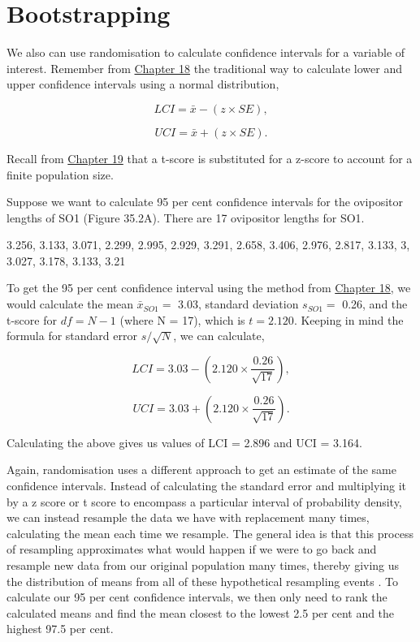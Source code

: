 \documentclass[
]{scrbook}
\begin{document}
\hypertarget{bootstrapping}{%
\section{Bootstrapping}\label{bootstrapping}}

We also can use randomisation to calculate confidence intervals for a variable of interest. Remember from \protect\hyperlink{Chapter_18}{Chapter 18} the traditional way to calculate lower and upper confidence intervals using a normal distribution,

\[LCI = \bar{x} - (z \times SE),\]

\[UCI = \bar{x} + (z \times SE).\]

Recall from \protect\hyperlink{Chapter_19}{Chapter 19} that a t-score is substituted for a z-score to account for a finite population size.

Suppose we want to calculate 95 per cent confidence intervals for the ovipositor lengths of SO1 (Figure 35.2A).
There are 17 ovipositor lengths for SO1.

3.256, 3.133, 3.071, 2.299, 2.995, 2.929, 3.291, 2.658, 3.406, 2.976, 2.817, 3.133, 3, 3.027, 3.178, 3.133, 3.21

To get the 95 per cent confidence interval using the method from \protect\hyperlink{Chapter_18}{Chapter 18}, we would calculate the mean \(\bar{x}_{SO1} =\) 3.03, standard deviation \(s_{SO1} =\) 0.26, and the t-score for \(df = N - 1\) (where N = 17), which is \(t = 2.120\).
Keeping in mind the formula for standard error \(s/\sqrt{N}\), we can calculate,

\[LCI = 3.03 - \left(2.120 \times \frac{0.26}{\sqrt{17}}\right),\]

\[UCI = 3.03 + \left(2.120 \times \frac{0.26}{\sqrt{17}}\right).\]

Calculating the above gives us values of LCI = 2.896 and UCI = 3.164.

Again, randomisation uses a different approach to get an estimate of the same confidence intervals.
Instead of calculating the standard error and multiplying it by a z score or t score to encompass a particular interval of probability density, we can instead resample the data we have with replacement many times, calculating the mean each time we resample.
The general idea is that this process of resampling approximates what would happen if we were to go back and resample new data from our original population many times, thereby giving us the distribution of means from all of these hypothetical resampling events \citep{Manly2007}.
To calculate our 95 per cent confidence intervals, we then only need to rank the calculated means and find the mean closest to the lowest 2.5 per cent and the highest 97.5 per cent.
\end{document}
